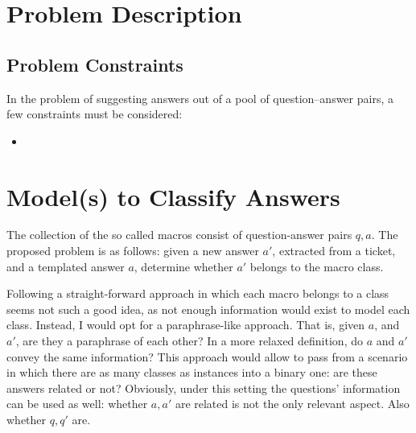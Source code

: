 \documentclass{sig-alternate-05-2015}
\begin{document}
\section{Problem Description} 


\subsection{Problem Constraints}

In the problem of suggesting answers out of a pool of question--answer pairs, a 
few constraints must be considered:

\begin{itemize}
\item 
\end{itemize}





\section{Model(s) to Classify Answers}
\label{sec:answers}
The collection of the so called macros consist of question-answer pairs $q,a$. 
The proposed problem is as follows: given a new answer $a'$, extracted from a 
ticket, and a templated answer $a$,  determine whether $a'$ belongs to the macro 
class. 

Following a straight-forward approach in which each macro belongs to a class 
seems not such a good idea, as not enough information would exist to model 
each class. Instead, I would opt for a paraphrase-like approach. That is, given 
$a$, and $a'$, are they a paraphrase of each other? In a more relaxed 
definition, do $a$ and $a'$ convey the same information? This approach would 
allow to pass from a scenario in which there are as many classes as instances 
into a binary one: are these answers related or not? Obviously, under this 
setting the questions' information can be used as well: whether $a,a'$ are 
related is not the only relevant aspect. Also whether $q,q'$ are. 
\end{document}
